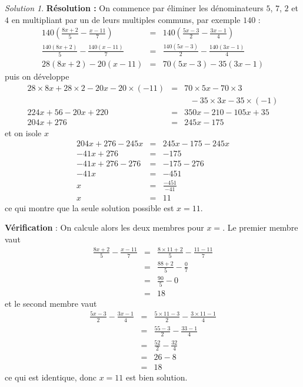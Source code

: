 \documentclass[14pt]{article}
\theoremstyle{remark}
\newtheorem*{sol}{Solution}
\newcounter{n}
\theoremstyle{plain}
\begin{document}
\begin{sol}
\textbf{Résolution :} On commence par éliminer les dénominateurs $5$, $7$, $2$ et $4$ en multipliant par un de leurs multiples communs, par exemple $140$ : 
\begin{eqnarray*}
140\left(\frac{8x+2}5 - \frac{x-11}7 \right)
&=& 140\left(\frac{5x-3}2 - \frac{3x-1}4\right)\\
\frac{140(8x+2)}5 - \frac{140(x-11)}7 
&=& \frac{140(5x-3)}2 - \frac{140(3x-1)}4 \\
28(8x+2) - 20(x-11) &=& 70(5x-3)-35(3x-1)
\end{eqnarray*} puis on développe
\begin{eqnarray*} 
28\times 8x+28\times2 - 20x-20\times(-11) &=& 70\times 5x-70\times 3\\
&&\text{           }-35\times 3x-35\times (-1)\\
224x + 56 - 20x + 220 &=& 350x - 210 - 105x + 35 \\
204x+276 &=& 245x- 175
\end{eqnarray*}et on isole $x$
\begin{eqnarray*}
204x+276 -245x&=& 245x- 175-245x\\
-41x+276 &=& -175 \\
-41x+276-276 &=& -175-276 \\
-41 x &=& -451 \\
x&=&\frac{-451}{-41} \\
x&=& 11
\end{eqnarray*}
ce qui montre que la seule solution possible est $x=11$. 

\textbf{Vérification} : On calcule alors les deux membres pour $x=$. Le premier membre vaut 
\begin{eqnarray*}\frac{8x+2}5 - \frac{x-11}7 &=&
\frac{8\times11+2}5 - \frac{11-11}7\\
&=&\frac{88+2}5 - \frac07\\
&=&\frac{90}5-0 \\
&=& 18
\end{eqnarray*}
et le second membre vaut 
\begin{eqnarray*}\frac{5x-3}2 - \frac{3x-1}4&=&
\frac{5\times11-3}2-\frac{3\times11-1}4\\
&=& \frac{55-3}2-\frac{33-1}4 \\
&=& \frac{52}2-\frac{32}4\\
&=& 26 - 8 \\
&=& 18
\end{eqnarray*} ce qui est identique, donc $x=11$ est bien solution.
\end{sol}
\end{document}
